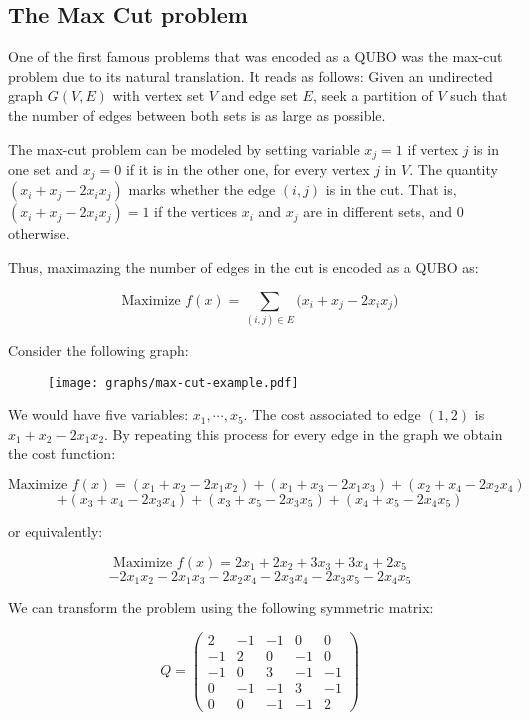 \subsection{The Max Cut problem}


One of the first famous problems that was encoded as a QUBO was the max-cut problem due to its natural translation. It reads as follows: Given an undirected graph $G(V, E)$ with vertex set $V$ and edge set $E$, seek a partition of $V$ such that the number of edges between both sets is as large as possible.

The max-cut problem can be modeled by setting variable $x_j = 1$ if vertex $j$ is in one set and $x_j = 0$ if it is in the other one, for every vertex $j$ in $V$. The quantity $(x_i + x_j - 2 x_i x_j)$ marks whether the edge $(i,j)$ is in the cut. That is, $(x_i + x_j - 2 x_i x_j) = 1$ if the vertices $x_i$ and $x_j$ are in different sets, and $0$ otherwise.

Thus, maximazing the number of edges in the cut is encoded as a QUBO as:

$$ \text{Maximize } f(x) = \sum_{(i,j) \in E} \big( x_i + x_j - 2 x_i x_j \big) $$




Consider the following graph:

\begin{figure}[H]
	\texttt{[image: graphs/max-cut-example.pdf]}
	\centering
\end{figure}

We would have five variables: $x_1, \cdots, x_5$. The cost associated to edge $(1,2)$ is $x_1 + x_2 - 2 x_1 x_2$. By repeating this process for every edge in the graph we obtain the cost function:

$$ \text{Maximize  } f(x) = (x_1 + x_2 - 2 x_1 x_2) + (x_1 + x_3 - 2 x_1 x_3) + (x_2 + x_4 - 2 x_2 x_4) $$
$$ +(x_3 + x_4 - 2 x_3 x_4) + (x_3 + x_5 - 2 x_3 x_5) + (x_4 + x_5 - 2 x_4 x_5) $$

or equivalently:

$$ \text{Maximize  } f(x) = 2x_1 + 2x_2 + 3x_3 + 3x_4 + 2x_5$$ 
$$ - 2x_1x_2 - 2x_1x_3 - 2x_2x_4 - 2x_3x_4 - 2x_3x_5 - 2x_4x_5 $$

We can transform the problem using the following symmetric matrix:

$$
	Q = 
	\begin{pmatrix}
	2 & -1 & -1 & 0 & 0 \\
	-1 & 2 & 0 & -1 & 0 \\
	-1 & 0 & 3 & -1 & -1 \\
	0 & -1 & -1 & 3 & -1 \\
	0 & 0 & -1 & -1 & 2
	\end{pmatrix}
$$

